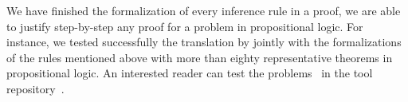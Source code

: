 \documentclass[../main.tex]{subfiles}
\begin{document}









We have finished the formalization of every inference rule in
a \Metis proof, we are able to justify step-by-step any proof
for a problem in propositional logic.
For instance, we tested successfully the translation by \Athena jointly with
the \Agda formalizations of the rules mentioned above with more than eighty
representative theorems in propositional logic. An interested reader can test
the problems~\cite{Prieto-Cubides2017} in the \Athena tool
repository~\cite{Athena}.
\end{document}
